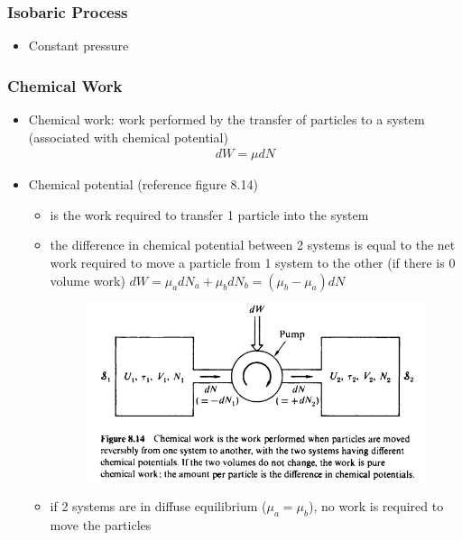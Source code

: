 \subsubsection{Isobaric Process}
\begin{itemize}
	\item Constant pressure
\end{itemize}

\subsubsection{Chemical Work}
\begin{itemize}
	\item Chemical work: work performed by the transfer of particles to a system (associated with
	      chemical potential)
	      \begin{align}
		      dW = \mu dN
	      \end{align}
	\item Chemical potential (reference figure 8.14)
	      \begin{itemize}
		      \item is the work required to transfer 1 particle into the system
		      \item the difference in chemical potential between 2 systems is equal to the net work
		            required to move a particle from 1 system to the other (if there is 0 volume work)
		            $dW = \mu_a dN_a + \mu_b dN_b = (\mu_b - \mu_a)dN$
		            \begin{figure}[h]
			            \centering
			            \includegraphics[width=.75\textwidth]{Figures/chemical_work.png}
			            \label{fig:chemical_work}
		            \end{figure}
		      \item if 2 systems are in diffuse equilibrium ($\mu_a = \mu_b$), no work is required to move
		            the particles
	      \end{itemize}
\end{itemize}


